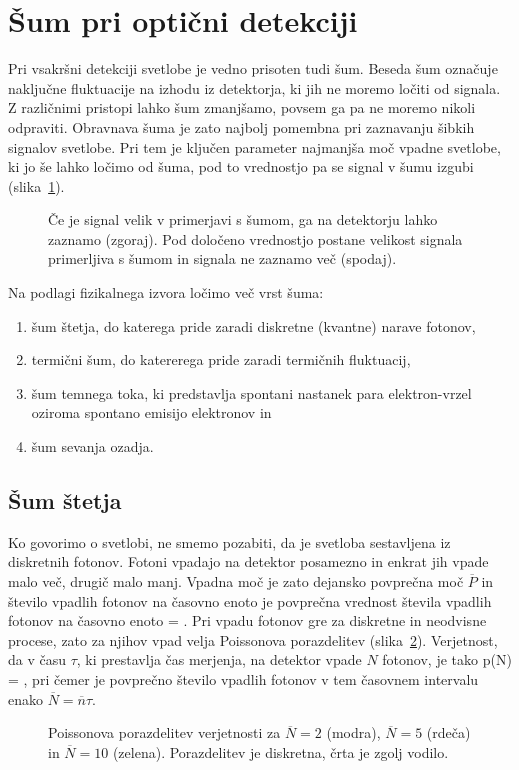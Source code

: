 \section{Šum pri optični detekciji}
Pri vsakršni detekciji svetlobe je vedno prisoten tudi šum. Beseda šum označuje naključne 
fluktuacije na izhodu iz detektorja, ki jih ne moremo ločiti od signala. Z različnimi 
pristopi lahko šum zmanjšamo, povsem ga pa ne moremo nikoli odpraviti. Obravnava 
šuma je zato najbolj pomembna pri zaznavanju šibkih signalov svetlobe. Pri tem je ključen
parameter najmanjša moč vpadne svetlobe, ki jo še lahko ločimo od šuma, pod to vrednostjo 
pa se signal v šumu izgubi (slika~\ref{11_sum}).
\begin{figure}[h]
\centering
\def\svgwidth{140truemm} 

\caption{Če je signal velik v primerjavi s šumom, ga na detektorju lahko zaznamo (zgoraj). 
Pod določeno vrednostjo postane velikost signala primerljiva s šumom in signala ne zaznamo več
(spodaj).}
\label{11_sum}
\end{figure}

Na podlagi fizikalnega izvora ločimo več vrst šuma:
\begin{enumerate}
\item šum štetja, do katerega pride zaradi diskretne (kvantne) narave fotonov,
\item termični šum, do katererega pride zaradi termičnih fluktuacij,
\item šum temnega toka, ki predstavlja spontani nastanek para elektron-vrzel oziroma spontano
emisijo elektronov in
\item šum sevanja ozadja.
\end{enumerate}

\subsection*{Šum štetja} 
Ko govorimo o svetlobi, ne smemo pozabiti, da je svetloba sestavljena iz diskretnih fotonov. 
Fotoni vpadajo na detektor posamezno in enkrat jih vpade malo več, 
drugič malo manj. Vpadna moč je zato dejansko povprečna moč $\overline{P}$ in število 
vpadlih fotonov na časovno enoto je povprečna vrednost števila vpadlih fotonov na časovno enoto
\beq
{} = .
\eeq
Pri vpadu fotonov gre za diskretne in neodvisne procese, zato za njihov vpad velja
Poissonova porazdelitev (slika~\ref{11_Poiss}). Verjetnost, da v času $\tau$, ki prestavlja 
čas merjenja, na detektor vpade $N$ fotonov, je tako 
\beq
p(N) = ,
\label{Poisson}
\eeq
pri čemer je povprečno število vpadlih fotonov v tem časovnem intervalu 
enako $\overline{N} = \overline{n}\tau$.
\begin{figure}[h]
\centering
\def\svgwidth{90truemm} 

\caption{Poissonova porazdelitev verjetnosti za $\overline{N}=2$ (modra), 
$\overline{N}=5$ (rdeča) in $\overline{N}=10$ (zelena). Porazdelitev je 
diskretna, črta je zgolj vodilo.}
\label{11_Poiss}
\end{figure}


